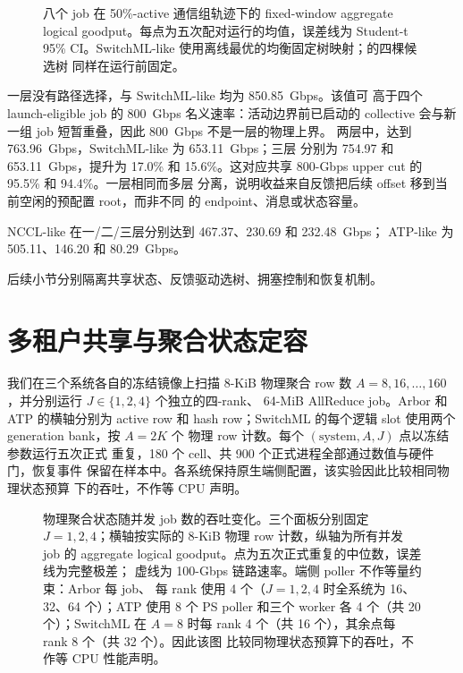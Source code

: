 \begin{figure}[t]
\centering

\caption{八个 job 在 50\%-active 通信组轨迹下的 fixed-window aggregate
logical goodput。每点为五次配对运行的均值，误差线为 Student-t 95\%
CI。SwitchML-like 使用离线最优的均衡固定树映射；\sysname 的四棵候选树
同样在运行前固定。}
\label{fig:capstone-throughput}
\end{figure}

一层没有路径选择，\sysname 与 SwitchML-like 均为 850.85~Gbps。该值可
高于四个 launch-eligible job 的 800~Gbps 名义速率：活动边界前已启动的
collective 会与新一组 job 短暂重叠，因此 800~Gbps 不是一层的物理上界。
两层中，\sysname 达到 763.96~Gbps，SwitchML-like 为 653.11~Gbps；三层
分别为 754.97 和 653.11~Gbps，提升为 17.0\% 和 15.6\%。这对应共享
800-Gbps upper cut 的 95.5\% 和 94.4\%。一层相同而多层
分离，说明收益来自反馈把后续 offset 移到当前空闲的预配置 root，而非不同
的 endpoint、消息或状态容量。

NCCL-like 在一/二/三层分别达到 467.37、230.69 和 232.48~Gbps；
ATP-like 为 505.11、146.20 和 80.29~Gbps。

后续小节分别隔离共享状态、反馈驱动选树、拥塞控制和恢复机制。

\section{多租户共享与聚合状态定容}
\label{ssec:eval-state}
\label{ssec:eval-multitenant}

我们在三个系统各自的冻结镜像上扫描 8-KiB 物理聚合 row 数
$A=8,16,\ldots,160$，并分别运行 $J\in\{1,2,4\}$ 个独立的四-rank、
64-MiB AllReduce job。Arbor 和 ATP 的横轴分别为 active row 和 hash
row；SwitchML 的每个逻辑 slot 使用两个 generation bank，按 $A=2K$ 个
物理 row 计数。每个 $(\text{system},A,J)$ 点以冻结参数运行五次正式
重复，180 个 cell、共 900 个正式进程全部通过数值与硬件门，恢复事件
保留在样本中。各系统保持原生端侧配置，该实验因此比较相同物理状态预算
下的吞吐，不作等 CPU 声明。

\begin{figure}[t]
\centering

\caption{物理聚合状态随并发 job 数的吞吐变化。三个面板分别固定
$J=1,2,4$；横轴按实际的 8-KiB 物理 row 计数，纵轴为所有并发 job 的
aggregate logical goodput。点为五次正式重复的中位数，误差线为完整极差；
虚线为 100-Gbps 链路速率。端侧 poller 不作等量约束：Arbor 每 job、
每 rank 使用 4 个（$J=1,2,4$ 时全系统为 16、32、64 个）；ATP 使用
8 个 PS poller 和三个 worker 各 4 个（共 20 个）；SwitchML 在 $A=8$
时每 rank 4 个（共 16 个），其余点每 rank 8 个（共 32 个）。因此该图
比较同物理状态预算下的吞吐，不作等 CPU 性能声明。}
\label{fig:physical-state-jobs}
\end{figure}


